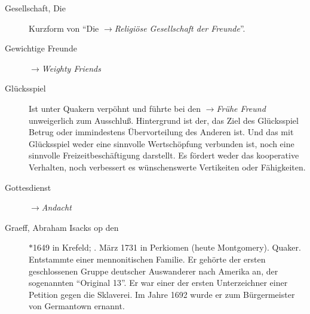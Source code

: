 \begin{description}
 \item[Gesellschaft, Die] Kurzform von "`Die
 $\to$\textit{Religiöse Gesellschaft der Freunde}"'.

\item[Gewichtige Freunde] $\to$\textit{Weighty Friends}

\item[Glücksspiel] Ist unter Quakern verpöhnt und führte bei den
$\to$\textit{Frühe Freund} unweigerlich zum Ausschluß. Hintergrund ist der,
das Ziel des Glücksspiel Betrug oder immindestens Übervorteilung des Anderen
ist. Und das mit Glücksspiel weder eine sinnvolle Wertschöpfung verbunden ist,
noch eine sinnvolle Freizeitbeschäftigung darstellt. Es fördert weder das
kooperative Verhalten, noch verbessert es wünschenswerte Vertikeiten oder
Fähigkeiten.

\item[Gottesdienst] $\to$\textit{Andacht}

 \item[Graeff, Abraham Isacks op den]  $\ast$1649 in Krefeld; . März 1731
 in Perkiomen (heute Montgomery). Quaker. Entstammte einer mennonitischen Familie.
Er gehörte der ersten geschlossenen Gruppe deutscher Auswanderer nach Amerika
an, der sogenannten "`Original 13"'. Er war einer der ersten Unterzeichner einer
Petition gegen die Sklaverei. Im Jahre 1692 wurde er zum Bürgermeister von
Germantown ernannt.


\end{description}
